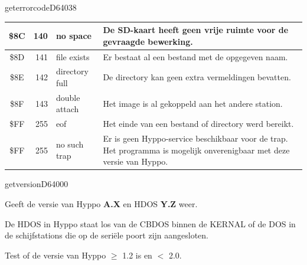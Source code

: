 \begin{hyppotrap}{geterrorcode}{D640}{38}
{\begin{longtable}{|c|r|l|p{8cm}|}
    \index{Hyppo-foutcodes!\$8C}
    \$8C & 140 & no space &    De SD-kaart heeft geen vrije ruimte voor de gevraagde bewerking.
    \\\hline
    \index{Hyppo-foutcodes!\$8D}
    \$8D & 141 & file exists &    Er bestaat al een bestand met de opgegeven naam.
    \\\hline
    \index{Hyppo-foutcodes!\$8E}
    \$8E & 142 & directory full &    De directory kan geen extra vermeldingen bevatten.
    \\\hline
    \index{Hyppo-foutcodes!\$8F}
    \$8F & 143 & double attach &    Het image is al gekoppeld aan het andere station.
    \\\hline
    \index{Hyppo-foutcodes!\$FF}
    \$FF & 255 & eof &    Het einde van een bestand of directory werd bereikt.
    \\\hline
    \index{Hyppo-foutcodes!\$FF}
    \$FF & 255 & no such trap &    Er is geen Hyppo-service beschikbaar voor de trap. Het programma is mogelijk onverenigbaar met deze versie van Hyppo.
    \\\hline
  \end{longtable}
}
\end{hyppotrap}


\newpage
\begin{hyppotrap}{getversion}{D640}{00}

\item [Dienst:]  Geeft de versie van Hyppo \textbf{A.X} en HDOS \textbf{Y.Z} weer.

\item [Resultaat:]

\item [Geschiedenis:]

\item [Opmerkingen:]  De HDOS in Hyppo staat los van de CBDOS binnen de KERNAL of de
  DOS in de schijfstations die op de seriële poort zijn aangesloten.

\item [Voorbeeld:]  Test of de versie van Hyppo $\geq$ 1.2 is en $<$ 2.0.
\end{hyppotrap}



